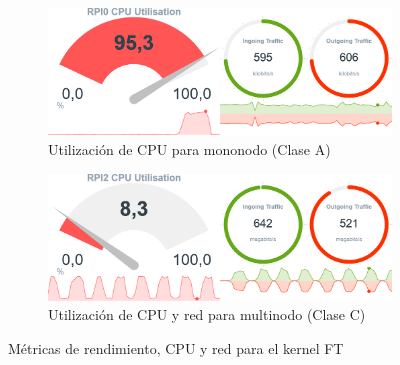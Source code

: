 \begin{figure}[htpb]
    \begin{subfigure}[c]{0.75\textwidth}
        \includegraphics[width=\textwidth]{img/benchmark_rev/ft_rev_sn.png}
        \caption{Utilización de CPU para mononodo (Clase A)}
        \label{fig:mops_rev_sn__ft}
    \end{subfigure}

    \vspace{0.5cm}
    
    \begin{subfigure}[c]{0.75\textwidth}
        \includegraphics[width=\textwidth]{img/benchmark_rev/ft_rev_mn.png}
        \caption{Utilización de CPU y red para multinodo (Clase C)}
        \label{fig:mops_rev_mn__ft}
    \end{subfigure}
    \caption{Métricas de rendimiento, CPU y red para el kernel FT}
    \label{fig:mops__ft}
\end{figure}

